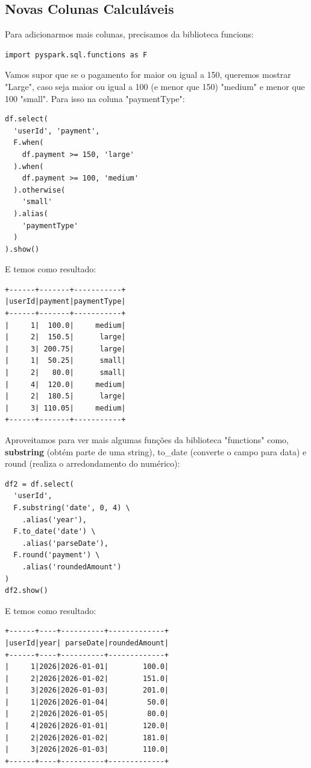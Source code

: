 \subsection{Novas Colunas Calculáveis}
Para adicionarmos mais colunas, precisamos da biblioteca funcions:
\begin{lstlisting}[]
import pyspark.sql.functions as F	
\end{lstlisting}

Vamos supor que se o pagamento for maior ou igual a 150, queremos mostrar "Large", caso seja maior ou igual a 100 (e menor que 150) "medium" e menor que 100 "small". Para isso na coluna "paymentType": 
\begin{lstlisting}[]
df.select(
  'userId', 'payment',
  F.when(
    df.payment >= 150, 'large'
  ).when(
    df.payment >= 100, 'medium'
  ).otherwise(
    'small'
  ).alias(
    'paymentType'
  )
).show() 	
\end{lstlisting}

E temos como resultado:
\begin{verbatim}
+------+-------+-----------+
|userId|payment|paymentType|
+------+-------+-----------+
|     1|  100.0|     medium|
|     2|  150.5|      large|
|     3| 200.75|      large|
|     1|  50.25|      small|
|     2|   80.0|      small|
|     4|  120.0|     medium|
|     2|  180.5|      large|
|     3| 110.05|     medium|
+------+-------+-----------+	
\end{verbatim}

Aproveitamos para ver mais algumas funções da biblioteca "functions" como, \textbf{substring} (obtém parte de uma string), to\_date (converte o campo para data) e round (realiza o arredondamento do numérico):
\begin{lstlisting}[]
df2 = df.select(
  'userId',
  F.substring('date', 0, 4) \
    .alias('year'),
  F.to_date('date') \
    .alias('parseDate'),
  F.round('payment') \
    .alias('roundedAmount')
)
df2.show()	
\end{lstlisting}

E temos como resultado:
\begin{verbatim}
+------+----+----------+-------------+
|userId|year| parseDate|roundedAmount|
+------+----+----------+-------------+
|     1|2026|2026-01-01|        100.0|
|     2|2026|2026-01-02|        151.0|
|     3|2026|2026-01-03|        201.0|
|     1|2026|2026-01-04|         50.0|
|     2|2026|2026-01-05|         80.0|
|     4|2026|2026-01-01|        120.0|
|     2|2026|2026-01-02|        181.0|
|     3|2026|2026-01-03|        110.0|
+------+----+----------+-------------+	
\end{verbatim}

